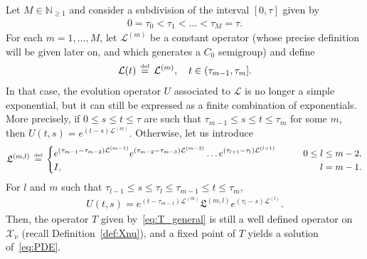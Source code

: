\documentclass[10pt,a4paper]{article}
\theoremstyle{plain}
\newcommand{\NN}{\mathbb N}
\renewcommand{\L}{\mathcal{L}}
\newcommand{\X}{\mathcal{X}}
\newcommand{\kL}{\mathfrak{L}}
\newcommand{\1}{\mathbf{1}}
\newcommand{\bydef}{\,\stackrel{\mbox{\tiny\textnormal{\raisebox{0ex}[0ex][0ex]{def}}}}{=}\,}
\begin{document}
Let $M\in\NN_{\geq 1}$ and consider a subdivision of the interval $[0,\tau]$ given by
\begin{align}
\label{eq:subdivision}
0 = \tau_0 < \tau_1 < \ldots < \tau_M = \tau.
\end{align}
For each $m=1,\ldots,M$, let $\L^{(m)}$ be a constant operator (whose precise definition will be given later on, and which generates a $C_0$ semigroup) and define
\begin{align}
\label{eq:L_piecewise}
\L(t) \bydef \L^{(m)},\quad t\in(\tau_{m-1},\tau_m].
\end{align}
In that case, the evolution operator $U$ associated to $\L$ is no longer a simple exponential, but it can still be expressed as a finite combination of exponentials. More precisely, if $0\leq s\leq t\leq \tau$ are such that $\tau_{m-1}\leq s\leq t\leq \tau_m$ for some $m$, then $U(t,s) = e^{(t-s)\L^{(m)}}$. Otherwise, let us introduce
\begin{align}
\label{eq:defkL}
\kL^{(m,l)} \bydef
\left\{
\begin{aligned}
& e^{(\tau_{m-1}-\tau_{m-2})\L^{(m-1)}} e^{(\tau_{m-2}-\tau_{m-3})\L^{(m-2)}} \ldots e^{(\tau_{l+1}-\tau_{l})\L^{(l+1)}} \qquad & 0\leq l\leq m-2, \\
& I , \qquad &l= m-1.
\end{aligned}
\right.
\end{align}
For $l$ and $m$ such that $\tau_{l-1} \leq s \leq \tau_l \leq \tau_{m-1} \leq t \leq \tau_{m}$,
\begin{align*}
U(t,s) = e^{(t-\tau_{m-1})\L^{(m)}} \kL^{(m,l)} e^{(\tau_l -s)\L^{(l)}}.
\end{align*}
Then, the operator $T$ given by~\eqref{eq:T_general} is still a well defined operator on $\X_\nu$ (recall Definition~\ref{def:Xnu}), and a fixed point of $T$ yields a solution of~\eqref{eq:PDE}.
\end{document}
